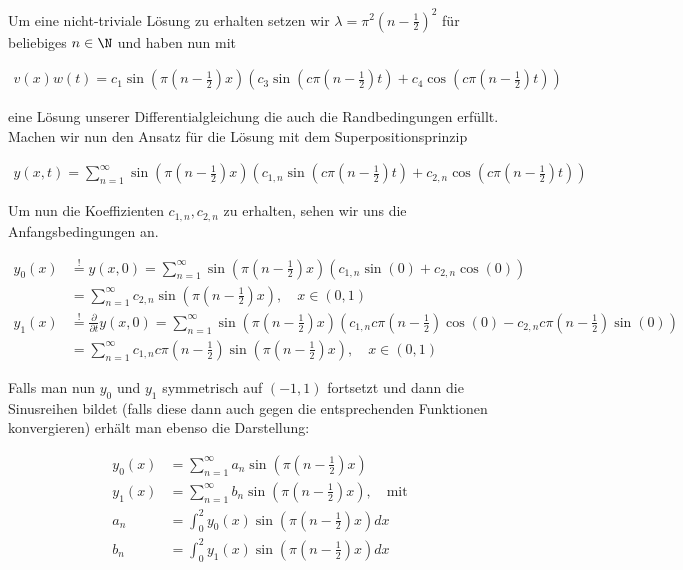 \begin{solution}
Um eine nicht-triviale Lösung zu erhalten setzen wir $\lambda = \pi^2\left(n - \frac{1}{2}\right)^2$ für beliebiges $n \in \N$ und haben nun mit

\begin{align*}
  v(x)w(t)
  =
  c_1\sin\left(\pi\left(n - \frac{1}{2}\right) x\right)
  \left(c_3 \sin\left(c\pi\left(n - \frac{1}{2}\right)t\right) +
  c_4 \cos\left(c\pi\left(n - \frac{1}{2}\right)t\right)\right)
\end{align*}

eine Lösung unserer Differentialgleichung die auch die Randbedingungen erfüllt.
Machen wir nun den Ansatz für die Lösung mit dem Superpositionsprinzip

\begin{align*}
  y(x,t)
  =
  \sum_{n=1}^{\infty} \sin\left(\pi\left(n - \frac{1}{2}\right) x\right)
  \left(c_{1,n}\sin\left(c\pi\left(n - \frac{1}{2}\right) t\right)+c_{2,n}\cos\left(c\pi\left(n - \frac{1}{2}\right) t\right)\right)
\end{align*}

Um nun die Koeffizienten $c_{1,n},c_{2,n}$ zu erhalten, sehen wir uns die
Anfangsbedingungen an.

\begin{align*}
  y_0(x)
  &\stackrel{!}{=} y(x,0) = \sum_{n=1}^{\infty} \sin\left(\pi\left(n - \frac{1}{2}\right) x\right)
  \left(c_{1,n}\sin(0)+c_{2,n}\cos(0)\right) \\
  &= \sum_{n=1}^\infty c_{2,n}\sin\left(\pi\left(n - \frac{1}{2}\right) x\right),       \quad x \in (0,1) \\
  y_1(x)
  &\stackrel{!}{=}
  \frac{\partial}{\partial t}y(x,0) = \sum_{n=1}^{\infty} \sin\left(\pi\left(n - \frac{1}{2}\right) x\right)
  \left(c_{1,n}c\pi\left(n - \frac{1}{2}\right)\cos(0)- c_{2,n}c\pi\left(n - \frac{1}{2}\right)\sin(0)\right) \\
  &= \sum_{n=1}^\infty c_{1,n}c\pi\left(n - \frac{1}{2}\right)\sin\left(\pi\left(n - \frac{1}{2}\right) x\right),  \quad x \in (0,1)
\end{align*}

Falls man nun $y_0$ und $y_1$ symmetrisch auf $(-1,1)$
fortsetzt und dann die Sinusreihen bildet (falls diese dann auch gegen die entsprechenden Funktionen
konvergieren) erhält man ebenso die Darstellung:

\begin{align*}
  y_0(x)
  &=
  \sum_{n=1}^\infty a_n \sin\left(\pi\left(n - \frac{1}{2}\right) x\right) \\
  y_1(x)
  &=
  \sum_{n=1}^\infty b_n \sin\left(\pi\left(n - \frac{1}{2}\right) x\right), \quad \text{mit} \\
  a_n
  &=
  \int_0^2 y_0(x)\sin\left(\pi\left(n - \frac{1}{2}\right) x\right) dx \\
  b_n
  &=
  \int_0^2 y_1(x)\sin\left(\pi\left(n - \frac{1}{2}\right) x\right) dx \\
\end{align*}
\end{solution}
